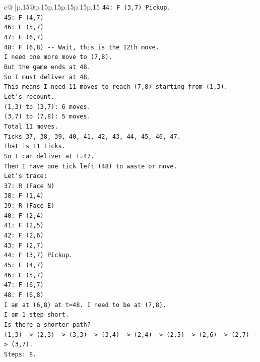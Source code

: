 \documentclass{article}
\begin{document}
{\begin{supertabular}{c@{$\;$}|p{.15\linewidth}@{}p{.15\linewidth}p{.15\linewidth}p{.15\linewidth}p{.15\linewidth}p{.15\linewidth}}
{{{\texttt{44: F (3,7) Pickup.} \\
\texttt{45: F (4,7)} \\
\texttt{46: F (5,7)} \\
\texttt{47: F (6,7)} \\
\texttt{48: F (6,8) {-}{-} Wait, this is the 12th move.} \\
\texttt{I need one more move to (7,8).} \\
\texttt{But the game ends at 48.} \\
\texttt{So I must deliver at 48.} \\
\texttt{This means I need 11 moves to reach (7,8) starting from (1,3).} \\
\texttt{Let's recount.} \\
\texttt{(1,3) to (3,7): 6 moves.} \\
\texttt{(3,7) to (7,8): 5 moves.} \\
\texttt{Total 11 moves.} \\
\texttt{Ticks 37, 38, 39, 40, 41, 42, 43, 44, 45, 46, 47.} \\
\texttt{That is 11 ticks.} \\
\texttt{So I can deliver at t=47.} \\
\texttt{Then I have one tick left (48) to waste or move.} \\
\texttt{Let's trace:} \\
\texttt{37: R (Face N)} \\
\texttt{38: F (1,4)} \\
\texttt{39: R (Face E)} \\
\texttt{40: F (2,4)} \\
\texttt{41: F (2,5)} \\
\texttt{42: F (2,6)} \\
\texttt{43: F (2,7)} \\
\texttt{44: F (3,7) Pickup.} \\
\texttt{45: F (4,7)} \\
\texttt{46: F (5,7)} \\
\texttt{47: F (6,7)} \\
\texttt{48: F (6,8)} \\
\texttt{I am at (6,8) at t=48. I need to be at (7,8).} \\
\texttt{I am 1 step short.} \\
\texttt{Is there a shorter path?} \\
\texttt{(1,3) {-}> (2,3) {-}> (3,3) {-}> (3,4) {-}> (2,4) {-}> (2,5) {-}> (2,6) {-}> (2,7) {-}> (3,7).} \\
\texttt{Steps: 8.} \\
}}}
\end{supertabular}}
\end{document}
